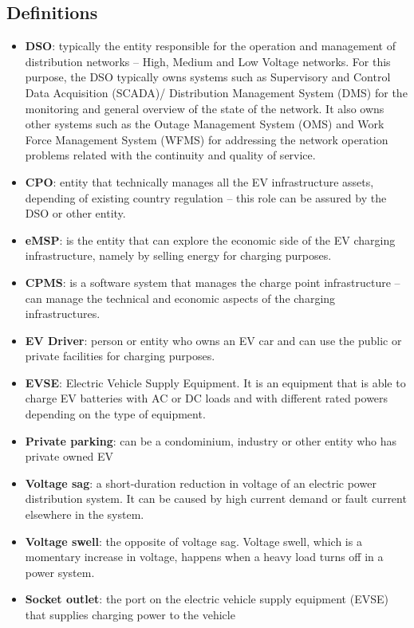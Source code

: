 \subsection{Definitions}
\begin{itemize}
    \item \textbf{DSO}: typically the entity responsible for the operation and management of distribution networks – High, Medium and Low Voltage networks. For this purpose, the DSO typically owns systems such as Supervisory and Control Data Acquisition (SCADA)/ Distribution Management System (DMS) for the monitoring and general overview of the state of the network. It also owns other systems such as the Outage Management System (OMS) and Work Force Management System (WFMS) for addressing the network operation problems related with the continuity and quality of service.
    \item \textbf{CPO}: entity that technically manages all the EV infrastructure assets, depending of existing country regulation – this role can be assured by the DSO or other entity.
    \item \textbf{eMSP}: is the entity that can explore the economic side of the EV charging infrastructure, namely by selling energy for charging purposes.
    \item \textbf{CPMS}: is a software system that manages the charge point infrastructure – can manage the technical and economic aspects of the charging infrastructures.
    \item  \textbf{EV Driver}: person or entity who owns an EV car and can use the public or private facilities for charging purposes.
    \item \textbf{EVSE}: Electric Vehicle Supply Equipment. It is an equipment that is able to charge EV batteries with AC or DC loads and with different rated powers depending on the type of equipment.
    \item  \textbf{Private parking}: can be a condominium, industry or other entity who has private owned EV
    \item \textbf{Voltage sag}: a short-duration reduction in voltage of an electric power distribution system. It can be caused by high current demand or fault current elsewhere in the system.
    \item \textbf{Voltage swell}: the opposite of voltage sag. Voltage swell, which is a momentary increase in voltage, happens when a heavy load turns off in a power system.
    \item \textbf{Socket outlet}: the port on the electric vehicle supply equipment (EVSE) that supplies charging power to the vehicle

\end{itemize}
